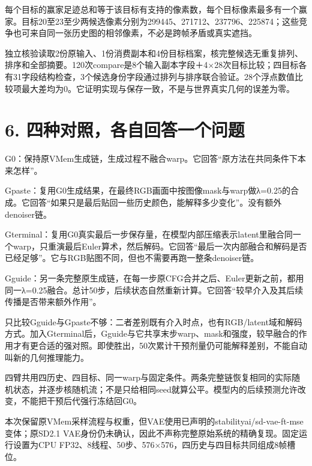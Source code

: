 \documentclass[UTF8,11pt,a4paper]{ctexart}
\begin{document}
每个目标的赢家足迹总和等于该目标有支持的像素数，每个目标像素最多有一个赢家。目标20至23至少两候选像素分别为299445、271712、237796、225874；这些竞争也可来自同一张历史图的相邻像素，不必是跨帧矛盾或真实遮挡。
\par


独立核验读取2份原输入、1份消费副本和4份目标档案，核完整候选无重复排列、排序和全部摘要。120次compare是8个输入副本字段＋4×28次目标比较；四目标各有31字段结构检查，3个候选身份字段通过排列与排序联合验证。28个浮点数值比较项最大差均为0。它证明实现与保存一致，不是与世界真实几何的误差为零。
\par


\clearpage

\section*{6. 四种对照，各自回答一个问题}

G0：保持原VMem生成链，生成过程不融合warp。它回答“原方法在共同条件下本来怎样”。
\par


Gpaste：复用G0生成结果，在最终RGB画面中按图像mask与warp做λ=0.25的合成。它回答“如果只是最后贴回一些历史颜色，能解释多少变化”。没有额外denoiser链。
\par


Gterminal：复用G0真实最后一步保存量，在模型内部压缩表示latent里融合同一个warp，只重演最后Euler算术，然后解码。它回答“最后一次内部融合和解码是否已经足够”。它与RGB贴图不同，但也不需要再跑一整条denoiser链。
\par


Gguide：另一条完整原生成链，在每一步原CFG合并之后、Euler更新之前，都用同一λ=0.25融合。总计50步，后续状态自然重新计算。它回答“较早介入及其后续传播是否带来额外作用”。
\par


只比较Gguide与Gpaste不够：二者差别既有介入时点，也有RGB/latent域和解码方式。加入Gterminal后，Gguide与它共享末步warp、mask和强度，较早融合的作用才有更合适的强对照。即使胜出，50次累计干预剂量仍可能解释差别，不能自动叫新的几何推理能力。
\par


四臂共用四历史、四目标、同一warp与固定条件。两条完整链恢复相同的实际随机状态，并逐步核随机流；不是只给相同seed就算公平。模型内的后续预测允许改变，不能把干预后代强行冻结回G0。
\par


本次保留原VMem采样流程与权重，但VAE使用已声明的stabilityai/sd-vae-ft-mse变体；原SD2.1 VAE身份仍未确认，因此不声称完整原始系统的精确复现。固定运行设置为CPU FP32、8线程、50步、576×576，四历史与四目标共同组成8帧槽位。
\par
\end{document}
